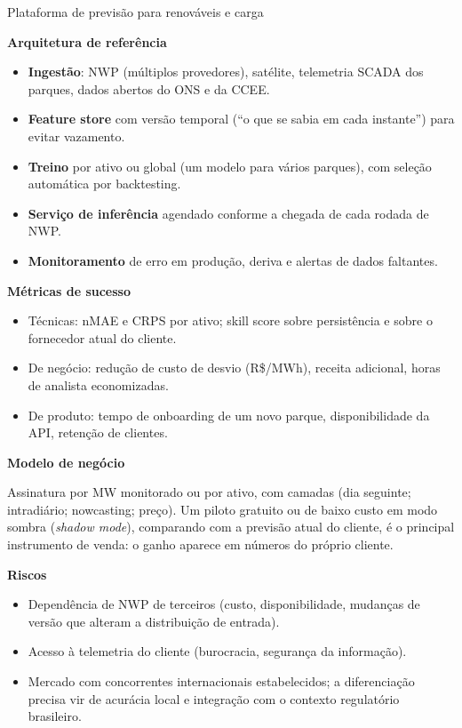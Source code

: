\documentclass[11pt,a4paper]{article}
\newcommand{\prodsec}[1]{\par\medskip\noindent\textbf{\color{prodcolor}#1}\par\smallskip}
\begin{document}
\begin{produto}{Plataforma de previsão para renováveis e carga}
\prodsec{Arquitetura de referência}
\begin{itemize}
  \item \textbf{Ingestão}: NWP (múltiplos provedores), satélite, telemetria
    SCADA dos parques, dados abertos do ONS e da CCEE.
  \item \textbf{Feature store} com versão temporal (``o que se sabia em cada
    instante'') para evitar vazamento.
  \item \textbf{Treino} por ativo ou global (um modelo para vários parques),
    com seleção automática por backtesting.
  \item \textbf{Serviço de inferência} agendado conforme a chegada de cada
    rodada de NWP.
  \item \textbf{Monitoramento} de erro em produção, deriva e alertas de dados
    faltantes.
\end{itemize}

\prodsec{Métricas de sucesso}
\begin{itemize}
  \item Técnicas: nMAE e CRPS por ativo; skill score sobre persistência e
    sobre o fornecedor atual do cliente.
  \item De negócio: redução de custo de desvio (R\$/MWh), receita
    adicional, horas de analista economizadas.
  \item De produto: tempo de onboarding de um novo parque, disponibilidade da
    API, retenção de clientes.
\end{itemize}

\prodsec{Modelo de negócio}
Assinatura por MW monitorado ou por ativo, com camadas (dia seguinte;
intradiário; nowcasting; preço). Um piloto gratuito ou de baixo custo em
modo sombra (\textit{shadow mode}), comparando com a previsão atual do cliente,
é o principal instrumento de venda: o ganho aparece em números do próprio
cliente.

\prodsec{Riscos}
\begin{itemize}
  \item Dependência de NWP de terceiros (custo, disponibilidade, mudanças de
    versão que alteram a distribuição de entrada).
  \item Acesso à telemetria do cliente (burocracia, segurança da informação).
  \item Mercado com concorrentes internacionais estabelecidos; a
    diferenciação precisa vir de acurácia local e integração com o contexto
    regulatório brasileiro.
\end{itemize}
\end{produto}
\end{document}
